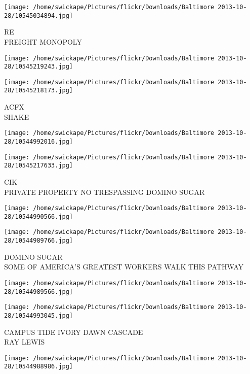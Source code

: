 \documentclass[10pt,letterpaper]{article}
\begin{document}
\vspace{0.25in}
\texttt{[image: /home/swickape/Pictures/flickr/Downloads/Baltimore 2013-10-28/10545034894.jpg]}

RE\\
FREIGHT MONOPOLY\\
\pagebreak

\texttt{[image: /home/swickape/Pictures/flickr/Downloads/Baltimore 2013-10-28/10545219243.jpg]}

\vspace{0.25in}
\texttt{[image: /home/swickape/Pictures/flickr/Downloads/Baltimore 2013-10-28/10545218173.jpg]}

ACFX\\
SHAKE\\
\pagebreak

\texttt{[image: /home/swickape/Pictures/flickr/Downloads/Baltimore 2013-10-28/10544992016.jpg]}

\vspace{0.25in}
\texttt{[image: /home/swickape/Pictures/flickr/Downloads/Baltimore 2013-10-28/10545217633.jpg]}

CIK\\
PRIVATE PROPERTY NO TRESPASSING DOMINO SUGAR\\
\pagebreak

\texttt{[image: /home/swickape/Pictures/flickr/Downloads/Baltimore 2013-10-28/10544990566.jpg]}

\vspace{0.25in}
\texttt{[image: /home/swickape/Pictures/flickr/Downloads/Baltimore 2013-10-28/10544989766.jpg]}

DOMINO SUGAR\\
SOME OF AMERICA'S GREATEST WORKERS WALK THIS PATHWAY\\
\pagebreak

\texttt{[image: /home/swickape/Pictures/flickr/Downloads/Baltimore 2013-10-28/10544989566.jpg]}

\vspace{0.25in}
\texttt{[image: /home/swickape/Pictures/flickr/Downloads/Baltimore 2013-10-28/10544993045.jpg]}

CAMPUS TIDE IVORY DAWN CASCADE\\
RAY LEWIS\\
\pagebreak

\texttt{[image: /home/swickape/Pictures/flickr/Downloads/Baltimore 2013-10-28/10544988986.jpg]}
\end{document}
